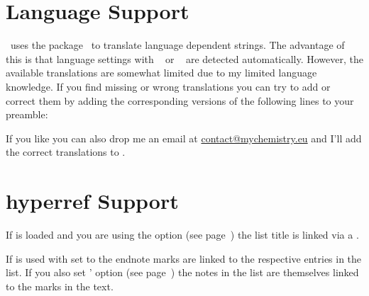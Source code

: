 \documentclass[load-preamble+]{cnltx-doc}
\begin{document}
\section{Language Support}\label{sec:language-support}
\enotez\ uses the  package~\cite{pkg:translations} to
translate language dependent strings.  The advantage of this is that language
settings with ~\cite{pkg:babel} or
~\cite{pkg:polyglossia} are detected automatically.  However,
the available translations are somewhat limited due to my limited language
knowledge.  If you find missing or wrong translations you can try to add or
correct them by adding the corresponding versions of the following lines to
your preamble:
\begin{sourcecode}
\end{sourcecode}
If you like you can also drop me an email at
\href{mailto:contact@mychemistry.eu}{contact@mychemistry.eu} and I'll add the
correct translations to \enotez.

\section{hyperref Support}
If  is loaded and you are using the option  (see
page~\pageref{key:totoc}) the list title is linked via a .

If  is used with  set to  the
endnote marks are linked to the respective entries in the
list.  If you also set \enotez' option 
(see page~\pageref{key:backref}) the notes in the list are themselves linked
to the marks in the text.

\printendnotes[addsec]
\end{document}
